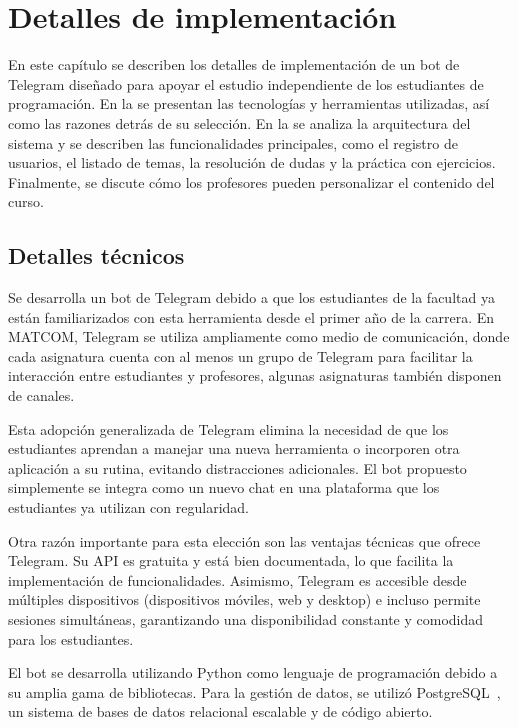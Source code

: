 \chapter{Detalles de implementación}\label{chapter:implementation}

En este capítulo se describen los detalles de implementación de un bot de Telegram diseñado para apoyar el estudio independiente de los estudiantes de programación. En la  se presentan las tecnologías y herramientas utilizadas, así como las razones detrás de su selección. En la  se analiza la arquitectura del sistema y se describen las funcionalidades principales, como el registro de usuarios, el listado de temas, la resolución de dudas y la práctica con ejercicios. Finalmente, se discute cómo los profesores pueden personalizar el contenido del curso.

\section{Detalles técnicos}\label{sec:technical-details}

Se desarrolla un bot de Telegram debido a que los estudiantes de la facultad ya están familiarizados con esta herramienta desde el primer año de la carrera. En \mbox{MATCOM}, Telegram se utiliza ampliamente como medio de comunicación, donde cada asignatura cuenta con al menos un grupo de Telegram para facilitar la interacción entre estudiantes y profesores, algunas asignaturas también disponen de canales. 

Esta adopción generalizada de Telegram elimina la necesidad de que los estudiantes aprendan a manejar una nueva herramienta o incorporen otra aplicación a su rutina, evitando distracciones adicionales. El bot propuesto simplemente se integra como un nuevo chat en una plataforma que los estudiantes ya utilizan con regularidad.

Otra razón importante para esta elección son las ventajas técnicas que ofrece Telegram. Su API es gratuita y está bien documentada, lo que facilita la implementación de funcionalidades. Asimismo, Telegram es accesible desde múltiples dispositivos (dispositivos móviles, web y desktop) e incluso permite sesiones simultáneas, garantizando una disponibilidad constante y comodidad para los estudiantes.

El bot se desarrolla utilizando Python como lenguaje de programación debido a su amplia gama de bibliotecas. Para la gestión de datos, se utilizó PostgreSQL~\cite{postgresql}, un sistema de bases de datos relacional escalable y de código abierto.

